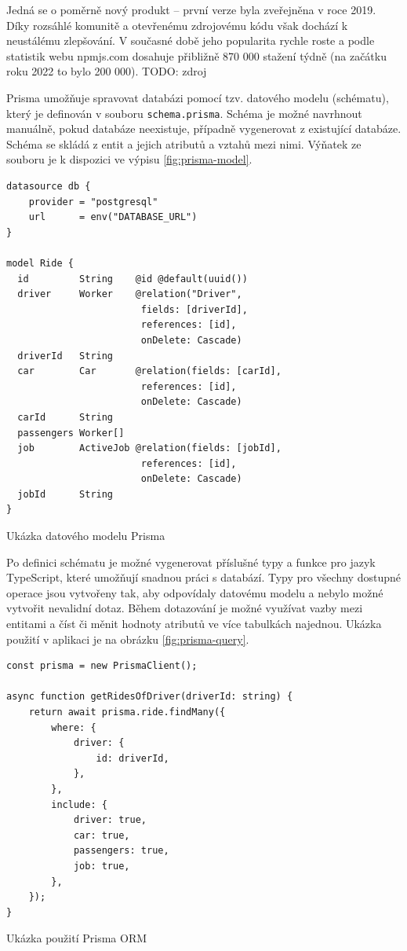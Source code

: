 Jedná se o poměrně nový produkt -- první verze byla zveřejněna v roce 2019. 
Díky rozsáhlé komunitě a otevřenému zdrojovému kódu však dochází k neustálému zlepšování.
V současné době jeho popularita rychle roste a podle statistik webu npmjs.com dosahuje přibližně 870 000 stažení týdně (na začátku roku 2022 to bylo 200 000). TODO: zdroj

Prisma umožňuje spravovat databázi pomocí tzv. datového modelu (schématu), který je definován v souboru \texttt{schema.prisma}. 
Schéma je možné navrhnout manuálně, pokud databáze neexistuje, případně vygenerovat z existující databáze. Schéma se skládá z entit a jejich atributů a vztahů mezi nimi.
Výňatek ze souboru je k dispozici ve výpisu \ref{fig:prisma-model}.

\begin{listing}[h]
\begin{verbatim}
datasource db {
    provider = "postgresql"
    url      = env("DATABASE_URL")
}

model Ride {
  id         String    @id @default(uuid())
  driver     Worker    @relation("Driver",
                        fields: [driverId],
                        references: [id],
                        onDelete: Cascade)
  driverId   String
  car        Car       @relation(fields: [carId], 
                        references: [id],
                        onDelete: Cascade)
  carId      String
  passengers Worker[]
  job        ActiveJob @relation(fields: [jobId], 
                        references: [id],
                        onDelete: Cascade)
  jobId      String
}
\end{verbatim}
\caption{Ukázka datového modelu Prisma}
\label{fig:prisma-model}
\end{listing}

Po definici schématu je možné vygenerovat příslušné typy a funkce pro jazyk TypeScript, které umožňují snadnou práci s databází.
Typy pro všechny dostupné operace jsou vytvořeny tak, aby odpovídaly datovému modelu a nebylo možné vytvořit nevalidní dotaz.
Během dotazování je možné využívat vazby mezi entitami a číst či měnit hodnoty atributů ve více tabulkách najednou.
Ukázka použití v aplikaci je na obrázku \ref{fig:prisma-query}.

\begin{listing}[h]
\begin{verbatim}
const prisma = new PrismaClient();

async function getRidesOfDriver(driverId: string) {
    return await prisma.ride.findMany({
        where: {    
            driver: {
                id: driverId,
            },
        },
        include: {
            driver: true,
            car: true,
            passengers: true,
            job: true,
        },
    });
}
\end{verbatim}
\caption{Ukázka použití Prisma ORM}
\label{fig:prisma-query}
\end{listing}





